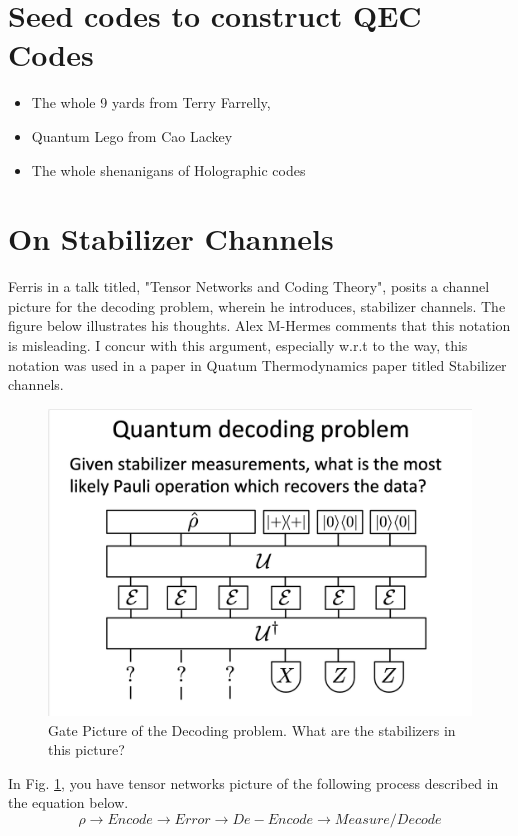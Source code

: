 \documentclass[%
 reprint,
amsmath,amssymb,
aps,
onecolumn,
]{revtex4-2}
\begin{document}
\section{Seed codes to construct QEC Codes}
\begin{itemize}
    \item The whole 9 yards from Terry Farrelly,
    \item Quantum Lego from Cao Lackey
    \item The whole shenanigans of Holographic codes
\end{itemize}


\section{On Stabilizer Channels}
Ferris in a talk titled, "Tensor Networks and Coding Theory", posits a channel picture for the decoding problem, wherein he introduces, stabilizer channels. The figure below illustrates his thoughts. Alex M-Hermes comments that this notation is misleading. I concur with this argument, especially w.r.t to the way, this notation was used in a paper in Quatum Thermodynamics paper titled Stabilizer channels. 

\begin{figure}[ht]
    \centering
    \includegraphics[scale=0.3]{../assets/decoding_gate_picture.png}
    \caption{Gate Picture of the Decoding problem. \textcolor{BrickRed}{What are the stabilizers in this picture?}}
    \label{fig:decode-gate-picture}
\end{figure}

In Fig. \ref{fig:decode-gate-picture}, you have tensor networks picture of the following process described in the equation below.
\begin{equation*}
    \rho \rightarrow Encode \rightarrow Error \rightarrow De-Encode \rightarrow Measure/Decode
\end{equation*}
\end{document}
